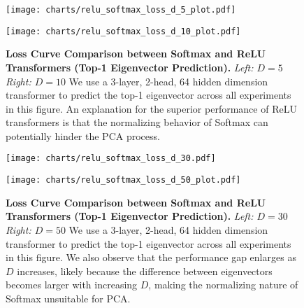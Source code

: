 

\begin{figure}[!h]
    \centering
    \begin{minipage}{0.45\textwidth}
        \centering
        \texttt{[image: charts/relu\_softmax\_loss\_d\_5\_plot.pdf]}
    \end{minipage}
    \hfill %
    \begin{minipage}{0.45\textwidth}
        \centering
        \texttt{[image: charts/relu\_softmax\_loss\_d\_10\_plot.pdf]}
    \end{minipage}
    \caption{\textbf{Loss Curve Comparison between Softmax and ReLU Transformers (Top-1 Eigenvector Prediction).}
    \emph{Left: $D=5$ }\emph{Right: $D=10$}
    We use a 3-layer, 2-head, 64 hidden dimension transformer to predict the top-1 eigenvector across all experiments in this figure. An explanation for the superior performance of ReLU transformers is that the normalizing behavior of Softmax can potentially hinder the PCA process.
    }
    \label{fig:relu_softmax1}
\end{figure}



\begin{figure}[!h]
    \centering
    \begin{minipage}{0.45\textwidth}
        \centering
        \texttt{[image: charts/relu\_softmax\_loss\_d\_30.pdf]}
    \end{minipage}
    \hfill %
    \begin{minipage}{0.45\textwidth}
        \centering
        \texttt{[image: charts/relu\_softmax\_loss\_d\_50\_plot.pdf]}
    \end{minipage}
    
    \caption{\textbf{Loss Curve Comparison between Softmax and ReLU Transformers (Top-1 Eigenvector Prediction).}
    \emph{Left: $D=30$ }\emph{Right: $D=50$}
    We use a 3-layer, 2-head, 64 hidden dimension transformer to predict the top-1 eigenvector across all experiments in this figure. We also observe that the performance gap enlarges as $D$ increases, likely because the difference between eigenvectors becomes larger with increasing $D$, making the normalizing nature of Softmax unsuitable for PCA.
    }
    \label{fig:relu_softmax2}
\end{figure}



